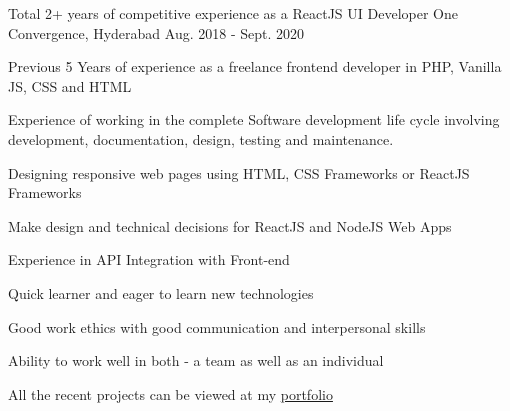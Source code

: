 \begin{cventries}
  \cventry
    {}
    {Total 2+ years of competitive experience as a ReactJS UI Developer}
    {One Convergence, Hyderabad}
    {Aug. 2018 - Sept. 2020}
    {
      \begin{cvitems}
        \item {Previous 5 Years of experience as a freelance frontend developer in PHP, Vanilla JS, CSS and HTML}
        \item {Experience of working in the complete Software development life cycle involving development, documentation, design, testing and maintenance.}
        \item {Designing responsive web pages using HTML, CSS Frameworks or ReactJS Frameworks}
        \item {Make design and technical decisions for ReactJS and NodeJS Web Apps}
        \item {Experience in API Integration with Front-end}
        \item {Quick learner and eager to learn new technologies}
        \item {Good work ethics with good communication and interpersonal skills}
        \item {Ability to work well in both - a team as well as an individual}
        \item {All the recent projects can be viewed at my \href{https://hdesign.in/portfolio\#portfolio/All}{\textmd{\color{awesome-skyblue} portfolio}}}
      \end{cvitems}
    }
\end{cventries}
